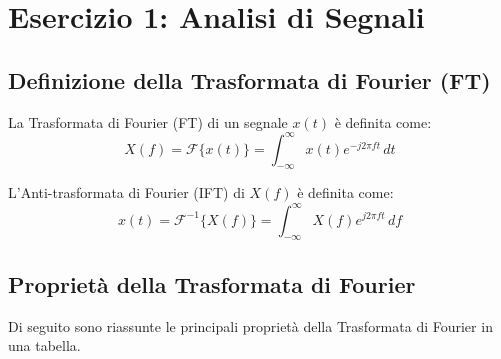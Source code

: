 \chapter{Esercizio 1: Analisi di Segnali}

\section{Definizione della Trasformata di Fourier (FT)}

La Trasformata di Fourier (FT) di un segnale $x(t)$ è definita come:
\begin{equation*}
    X(f) = \mathcal{F}\{x(t)\} = \int_{-\infty}^{\infty} x(t) e^{-j2\pi f t} \,dt
\end{equation*}

L'Anti-trasformata di Fourier (IFT) di $X(f)$ è definita come:
\begin{equation*}
    x(t) = \mathcal{F}^{-1}\{X(f)\} = \int_{-\infty}^{\infty} X(f) e^{j2\pi f t} \,df
\end{equation*}

\section{Proprietà della Trasformata di Fourier}
Di seguito sono riassunte le principali proprietà della Trasformata di Fourier in una tabella.

